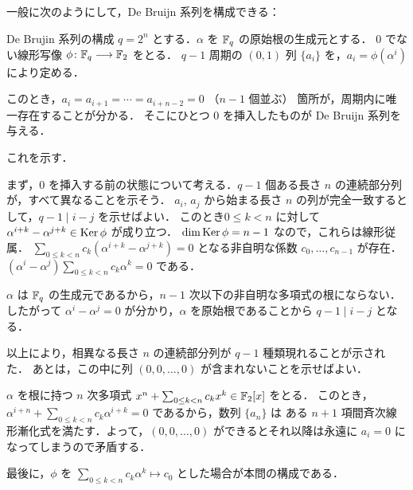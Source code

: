\subsection{}
一般に次のようにして，De Bruijn 系列を構成できる：

\begin{itembox}[l]{De Brujin 系列の構成}
 $q = 2^n$ とする．$\alpha$ を $\mathbb{F}_{q}$ の原始根の生成元とする．
 $0$ でない線形写像 $\phi\colon \mathbb{F}_{q} \longrightarrow \mathbb{F}_2$ をとる．
 $q-1$ 周期の $(0,1)$ 列 $\{a_i\}$ を，$a_i = \phi(\alpha^i)$ により定める．
 
 このとき，$a_i = a_{i+1} = \cdots = a_{i+n-2} = 0$ （$n-1$ 個並ぶ） 箇所が，周期内に唯一存在することが分かる．
 そこにひとつ $0$ を挿入したものが De Bruijn 系列を与える．
\end{itembox}

これを示す．

まず，$0$ を挿入する前の状態について考える．$q-1$ 個ある長さ $n$ の連続部分列が，すべて異なることを示そう．
$a_i$, $a_j$ から始まる長さ $n$ の列が完全一致するとして，$q-1\mid i-j$ を示せばよい．
このとき$0\leq k < n$ に対して $\alpha^{i+k} - \alpha^{j+k} \in \operatorname{Ker} \phi$ が成り立つ．
$\dim \operatorname{Ker} \phi = n-1$ なので，これらは線形従属．
$\sum_{0\leq k < n} c_k(\alpha^{i+k} - \alpha^{j+k}) = 0$ となる非自明な係数 $c_0, \ldots, c_{n-1}$ が存在．
$(\alpha^i-\alpha^j)\sum_{0\leq k < n}c_k\alpha^k = 0$ である．

$\alpha$ は $\mathbb{F}_q$ の生成元であるから，$n-1$ 次以下の非自明な多項式の根にならない．
したがって $\alpha^i - \alpha^j = 0$ が分かり，$\alpha$ を原始根であることから $q-1 \mid i-j$ となる．


以上により，相異なる長さ $n$ の連続部分列が $q-1$ 種類現れることが示された．
あとは，この中に列 $(0,0,\ldots, 0)$ が含まれないことを示せばよい．

$\alpha$ を根に持つ $n$ 次多項式 $x^n + \sum_{0\leq k < n} c_kx^k \in \mathbb{F}_2[x]$ をとる．
このとき，$\alpha^{i+n} + \sum_{0\leq k < n} c_k\alpha^{i+k} = 0$ であるから，数列 $\{a_n\}$ は
ある $n+1$ 項間斉次線形漸化式を満たす．よって，$(0,0,\ldots,0)$ ができるとそれ以降は永遠に
$a_i = 0$ になってしまうので矛盾する．


最後に，$\phi$ を $\sum_{0\leq k < n}c_k\alpha^k\longmapsto c_0$ とした場合が本問の構成である．